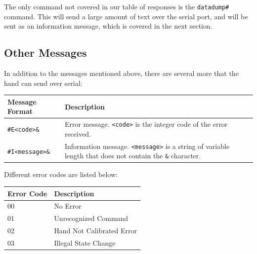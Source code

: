 \documentclass[letterpaper,notitlepage,10pt]{article}
\begin{document}
\bigskip

\noindent The only command not covered in our table of responses is the \verb;datadump#; command. This will send a large amount of text over the serial port, and will be sent as an information message, which is covered in the next section.



\subsection{Other Messages}
In addition to the messages mentioned above, there are several more that the hand can send over serial:\\

\begin{tabular}{l|p{}}
Message Format & Description \\
\hline
\verb;#E<code>&; & Error message. \verb;<code>; is the integer code of the error received. \\
\verb;#I<message>&; & Information message. \verb;<message>; is a string of variable length that does not contain the \verb;&; character.\\

\end{tabular}

\bigskip

\noindent Different error codes are listed below:\\

\begin{tabular}{|l|l|}
\hline
\textbf{Error Code} & \textbf{Description} \\ \hline
00 & No Error \\ \hline
01 & Unrecognized Command \\ \hline
02 & Hand Not Calibrated Error \\ \hline
03 & Illegal State Change \\ \hline
\end{tabular}\\


%

\end{document}
